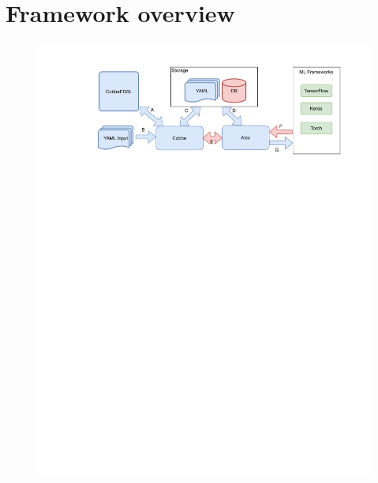 \section{Framework overview}



\begin{figure}
\includegraphics[width=\textwidth]{pictures/framework_pic}
\end{figure}
